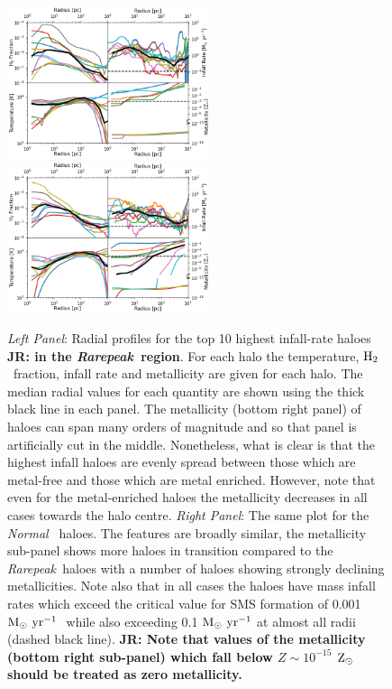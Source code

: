 \documentclass[twocolumn,iop,revtex4]{openjournal}
\newcommand{\msolaryr} {$\rm{M_{\odot}~yr^{-1}}~$}
\newcommand{\zsolar} {$\rm{Z_{\odot}}~$}
\newcommand{\molH} {$\rm{H_2}$~}
\newcommand{\rarepeak} {\textit{Rarepeak~}}
\newcommand{\normal} {\textit{Normal~}}
\def\jr#1{{\color{blue} \bf JR:  #1}}
\begin{document}
\begin{figure} [!t]
\centering
\begin{minipage}{175mm}      \begin{center} 
\centerline{
\includegraphics[width=0.525\textwidth]{FIGURES/MultiPlot_Rarepeak.png}
\includegraphics[width=0.525\textwidth]{FIGURES/MultiPlot_Normal.png}}
\caption{\textit{Left Panel}: Radial profiles for the top 10 highest infall-rate haloes
  \jr{in the \rarepeak region}. For
  each halo the temperature, \molH fraction, infall rate and metallicity are given for
  each halo. The median radial values for each quantity are shown using the
  thick black line in each panel. The metallicity (bottom right panel) of haloes can span many
  orders of magnitude and so that panel is artificially cut in the middle. Nonetheless, what is
  clear is that the highest infall haloes are evenly spread between those which are metal-free and
  those which are metal enriched. However, note that even for the metal-enriched haloes the
  metallicity decreases in all cases towards the halo centre. 
  \textit{Right Panel}: The same plot for the \normal
  haloes. The features are broadly similar, the metallicity sub-panel shows more haloes in transition
  compared to the \rarepeak haloes with a number of haloes showing strongly declining metallicities.
  Note also that in all cases the haloes have mass infall rates which exceed the critical value
  for SMS formation of 0.001 \msolaryr \citep{Haemmerle_2018} while also exceeding
  0.1 \msolaryr at almost all radii (dashed black line).
  \jr{Note that values of the metallicity (bottom right sub-panel) which fall below $Z \sim 10^{-15}$ \zsolar should be
    treated as zero metallicity.}
} \label{Fig:RadialProfiles}
\end{center} \end{minipage}

\end{figure}
\end{document}
